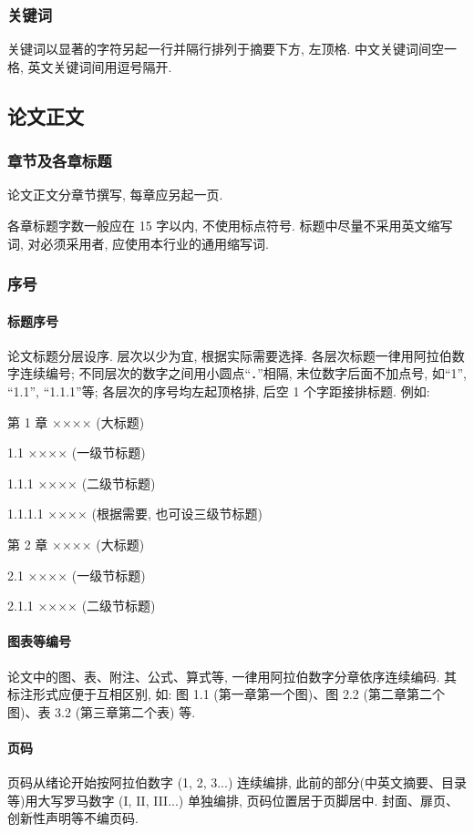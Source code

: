 \subsubsection{关键词}

关键词以显著的字符另起一行并隔行排列于摘要下方, 左顶格. 中文关键词间空一格, 英文关键词间用逗号隔开. 
\subsection{论文正文}

\subsubsection{章节及各章标题}

论文正文分章节撰写, 每章应另起一页.

各章标题字数一般应在 15 字以内, 不使用标点符号. 标题中尽量不采用英文缩写词, 对必须采用者, 应使用本行业的通用缩写词.

\subsubsection{序号}

\paragraph{标题序号}
论文标题分层设序. 层次以少为宜, 根据实际需要选择. 各层次标题一律用阿拉伯数字连续编号; 不同层次的数字之间用小圆点“．”相隔, 末位数字后面不加点号, 如“1”, “1.1”, “1.1.1”等; 各层次的序号均左起顶格排, 后空 1 个字距接排标题. 例如:

第 1 章 ×××× (大标题)

1.1 ×××× (一级节标题)

1.1.1 ×××× (二级节标题)

1.1.1.1 ×××× (根据需要, 也可设三级节标题)

第 2 章 ×××× (大标题)

2.1 ×××× (一级节标题)

2.1.1 ×××× (二级节标题)

\paragraph{图表等编号}
论文中的图、表、附注、公式、算式等, 一律用阿拉伯数字分章依序连续编码. 其标注形式应便于互相区别, 如: 图 1.1 (第一章第一个图)、图 2.2 (第二章第二个图)、表 3.2 (第三章第二个表) 等.

\paragraph{页码}
页码从绪论开始按阿拉伯数字 (1, 2, 3...) 连续编排, 此前的部分(中英文摘要、目录等)用大写罗马数字 (I, II, III...) 单独编排, 页码位置居于页脚居中. 封面、扉页、创新性声明等不编页码.

